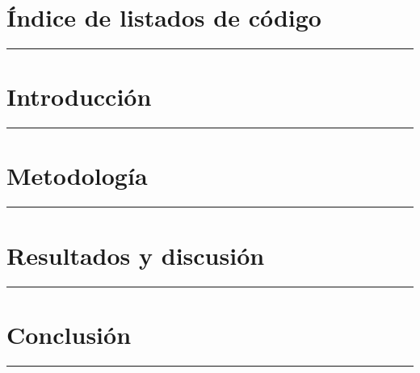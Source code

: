 \documentclass[a4paper,11pt]{article}
\begin{document}
\newpage
\thispagestyle{main}
\mbox{}
\newpage

\thispagestyle{main}
\renewcommand{\listtablename}{Índice de tablas}
\renewcommand{\cftafterlottitle}{%
  \par\nobreak
  {\color{tfgazul}\rule{\textwidth}{3pt}}%
  \par\nobreak
}
\listoftables
\thispagestyle{main}

\newpage
\thispagestyle{main}
\mbox{}
\newpage

\thispagestyle{main}
\renewcommand{\lstlistlistingname}{Índice de listados de código}
\section*{\lstlistlistingname}
{\color{tfgazul}\rule{\textwidth}{3pt}}

\begingroup
\renewcommand{\lstlistlistingname}{}
\lstlistoflistings
\endgroup
\thispagestyle{main}

\newpage
\thispagestyle{main}
\mbox{}
\newpage

\section{Introducción}
{\color{tfgazul}\rule{\textwidth}{3pt}}


\newpage
\section{Metodología}
{\color{tfgazul}\rule{\textwidth}{3pt}}


\newpage
\section{Resultados y discusión}
{\color{tfgazul}\rule{\textwidth}{3pt}}


\newpage
\section{Conclusión}
{\color{tfgazul}\rule{\textwidth}{3pt}}

\end{document}
